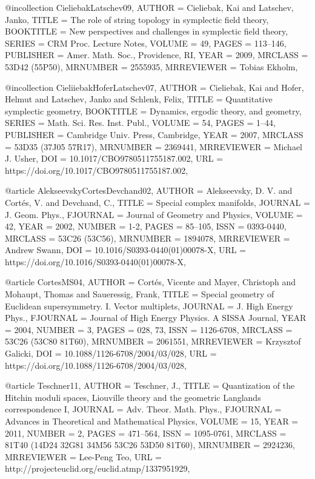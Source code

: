 @incollection {CieliebakLatschev09,
    AUTHOR = {Cieliebak, Kai and Latschev, Janko},
     TITLE = {The role of string topology in symplectic field theory},
 BOOKTITLE = {New perspectives and challenges in symplectic field theory},
    SERIES = {CRM Proc. Lecture Notes},
    VOLUME = {49},
     PAGES = {113--146},
 PUBLISHER = {Amer. Math. Soc., Providence, RI},
      YEAR = {2009},
   MRCLASS = {53D42 (55P50)},
  MRNUMBER = {2555935},
MRREVIEWER = {Tobias Ekholm},
}

@incollection {CieliiebakHoferLatschev07,
    AUTHOR = {Cieliebak, Kai and Hofer, Helmut and Latschev, Janko and
              Schlenk, Felix},
     TITLE = {Quantitative symplectic geometry},
 BOOKTITLE = {Dynamics, ergodic theory, and geometry},
    SERIES = {Math. Sci. Res. Inst. Publ.},
    VOLUME = {54},
     PAGES = {1--44},
 PUBLISHER = {Cambridge Univ. Press, Cambridge},
      YEAR = {2007},
   MRCLASS = {53D35 (37J05 57R17)},
  MRNUMBER = {2369441},
MRREVIEWER = {Michael J. Usher},
       DOI = {10.1017/CBO9780511755187.002},
       URL = {https://doi.org/10.1017/CBO9780511755187.002},
}

@article {AlekseevskyCortesDevchand02,
    AUTHOR = {Alekseevsky, D. V. and Cort\'{e}s, V. and Devchand, C.},
     TITLE = {Special complex manifolds},
   JOURNAL = {J. Geom. Phys.},
  FJOURNAL = {Journal of Geometry and Physics},
    VOLUME = {42},
      YEAR = {2002},
    NUMBER = {1-2},
     PAGES = {85--105},
      ISSN = {0393-0440},
   MRCLASS = {53C26 (53C56)},
  MRNUMBER = {1894078},
MRREVIEWER = {Andrew Swann},
       DOI = {10.1016/S0393-0440(01)00078-X},
       URL = {https://doi.org/10.1016/S0393-0440(01)00078-X},
}

@article {CortesMS04,
    AUTHOR = {Cort\'{e}s, Vicente and Mayer, Christoph and Mohaupt, Thomas and
              Saueressig, Frank},
     TITLE = {Special geometry of {E}uclidean supersymmetry. {I}. {V}ector
              multiplets},
   JOURNAL = {J. High Energy Phys.},
  FJOURNAL = {Journal of High Energy Physics. A SISSA Journal},
      YEAR = {2004},
    NUMBER = {3},
     PAGES = {028, 73},
      ISSN = {1126-6708},
   MRCLASS = {53C26 (53C80 81T60)},
  MRNUMBER = {2061551},
MRREVIEWER = {Krzysztof Galicki},
       DOI = {10.1088/1126-6708/2004/03/028},
       URL = {https://doi.org/10.1088/1126-6708/2004/03/028},
}

@article {Teschner11,
    AUTHOR = {Teschner, J.},
     TITLE = {Quantization of the {H}itchin moduli spaces, {L}iouville
              theory and the geometric {L}anglands correspondence {I}},
   JOURNAL = {Adv. Theor. Math. Phys.},
  FJOURNAL = {Advances in Theoretical and Mathematical Physics},
    VOLUME = {15},
      YEAR = {2011},
    NUMBER = {2},
     PAGES = {471--564},
      ISSN = {1095-0761},
   MRCLASS = {81T40 (14D24 32G81 34M56 53C26 53D50 81T60)},
  MRNUMBER = {2924236},
MRREVIEWER = {Lee-Peng Teo},
       URL = {http://projecteuclid.org/euclid.atmp/1337951929},
}

